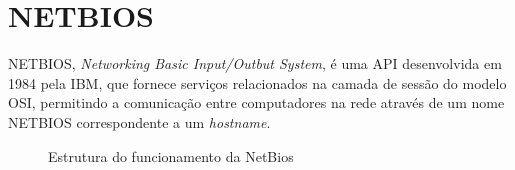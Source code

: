 \section{NETBIOS}

NETBIOS, \textit{Networking Basic Input/Outbut System}, é uma API desenvolvida em 1984 pela IBM, que fornece serviços relacionados na camada de sessão do modelo OSI, permitindo a comunicação entre computadores na rede através de um nome NETBIOS correspondente a um \textit{hostname}.\cite{WIKIPEDIA}

\begin{figure}[ht]
   	\centering
   	\caption{Estrutura do funcionamento da NetBios \cite{NETBIOS}}
    \label{netbios}
\end{figure}

% 
% 



